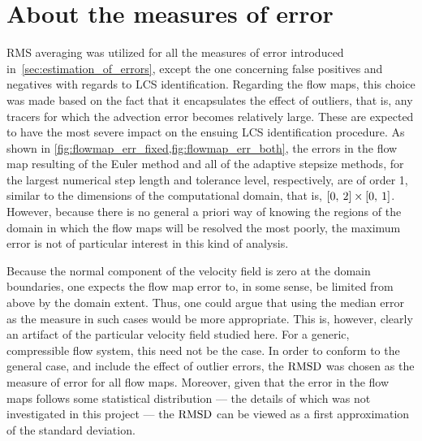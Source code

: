 \section{About the measures of error}
\label{sec:about_the_measures_of_error}

RMS averaging was utilized for all the measures of error introduced in~\cref{sec:estimation_of_errors},
except the one concerning false positives and negatives with regards to
LCS identification. Regarding the flow maps, this choice was made based on the
fact that it encapsulates the effect of outliers, that is, any tracers for which
the advection error becomes relatively large. These are expected to have the
most severe impact on the ensuing LCS identification procedure. As shown in
\cref{fig:flowmap_err_fixed,fig:flowmap_err_both}, the errors in the flow map
resulting of the Euler method and all of the adaptive stepsize methods, for the
largest numerical step length and tolerance level, respectively, are of order 1,
similar to the dimensions of the computational domain, that is,
$[0,\hspace{0.5ex}2]\times[0,\hspace{0.5ex}1]$. However, because there is no general
a priori way of knowing the regions of the domain in which the flow maps will be
resolved the most poorly, the maximum error is not of particular interest
in this kind of analysis.

Because the normal component of the velocity field is zero at the domain
boundaries, one expects the flow map error to, in some sense, be limited from
above by the domain extent. Thus, one could argue that using the median error
as the measure in such cases would be more appropriate. This is, however,
clearly an artifact of the particular velocity field studied here. For a
generic, compressible flow system, this need not be the case. In order to
conform to the general case, and include the effect of outlier errors, the
$\operatorname{RMSD}$ was chosen as the measure of error for all flow maps. Moreover, given
that the error in the flow maps follows some statistical distribution ---
the details of which was not investigated in this project --- the $\operatorname{RMSD}$
can be viewed as a first approximation of the standard deviation.

